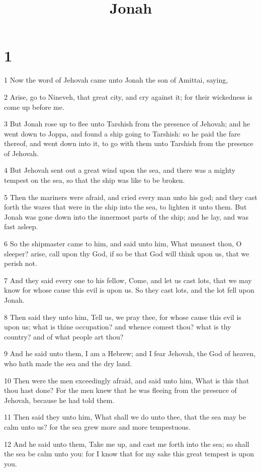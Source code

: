 

\title{Jonah}

\chapter{1}

\par 1 Now the word of Jehovah came unto Jonah the son of Amittai, saying,
\par 2 Arise, go to Nineveh, that great city, and cry against it; for their wickedness is come up before me.
\par 3 But Jonah rose up to flee unto Tarshish from the presence of Jehovah; and he went down to Joppa, and found a ship going to Tarshish: so he paid the fare thereof, and went down into it, to go with them unto Tarshish from the presence of Jehovah.
\par 4 But Jehovah sent out a great wind upon the sea, and there was a mighty tempest on the sea, so that the ship was like to be broken.
\par 5 Then the mariners were afraid, and cried every man unto his god; and they cast forth the wares that were in the ship into the sea, to lighten it unto them. But Jonah was gone down into the innermost parts of the ship; and he lay, and was fast asleep.
\par 6 So the shipmaster came to him, and said unto him, What meanest thou, O sleeper? arise, call upon thy God, if so be that God will think upon us, that we perish not.
\par 7 And they said every one to his fellow, Come, and let us cast lots, that we may know for whose cause this evil is upon us. So they cast lots, and the lot fell upon Jonah.
\par 8 Then said they unto him, Tell us, we pray thee, for whose cause this evil is upon us; what is thine occupation? and whence comest thou? what is thy country? and of what people art thou?
\par 9 And he said unto them, I am a Hebrew; and I fear Jehovah, the God of heaven, who hath made the sea and the dry land.
\par 10 Then were the men exceedingly afraid, and said unto him, What is this that thou hast done? For the men knew that he was fleeing from the presence of Jehovah, because he had told them.
\par 11 Then said they unto him, What shall we do unto thee, that the sea may be calm unto us? for the sea grew more and more tempestuous.
\par 12 And he said unto them, Take me up, and cast me forth into the sea; so shall the sea be calm unto you: for I know that for my sake this great tempest is upon you.
